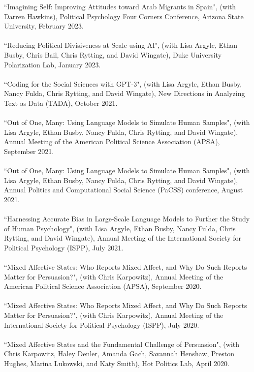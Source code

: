 \documentclass[10pt]{article}
\begin{document}
``Imagining Self: Improving Attitudes toward Arab Migrants in Spain", (with Darren Hawkins), Political Psychology Four Corners Conference, Arizona State University, February 2023.\\
\ \\
``Reducing Political Divisiveness at Scale using AI", (with Lisa Argyle, Ethan Busby, Chris Bail, Chris Rytting, and David Wingate), Duke University Polarization Lab, January 2023.\\
\ \\
``Coding for the Social Sciences with GPT-3", (with Lisa Argyle, Ethan Busby, Nancy Fulda, Chris Rytting, and David Wingate), New Directions in Analyzing Text as Data (TADA), October 2021.\\
\ \\
``Out of One, Many: Using Language Models to Simulate Human Samples", (with Lisa Argyle, Ethan Busby, Nancy Fulda, Chris Rytting, and David Wingate), Annual Meeting of the American Political Science Association (APSA), September 2021.\\
\ \\
``Out of One, Many: Using Language Models to Simulate Human Samples", (with Lisa Argyle, Ethan Busby, Nancy Fulda, Chris Rytting, and David Wingate), Annual Politics and Computational Social Science (PaCSS) conference, August 2021.\\
\ \\
``Harnessing Accurate Bias in Large-Scale Language Models to Further the Study of Human Psychology", (with Lisa Argyle, Ethan Busby, Nancy Fulda, Chris Rytting, and David Wingate), Annual Meeting of the International Society for Political Psychology (ISPP), July 2021.\\
\ \\
``Mixed Affective States: Who Reports Mixed Affect, and Why Do Such Reports Matter for Persuasion?", (with Chris Karpowitz), Annual Meeting of the American Political Science Association (APSA), September 2020.\\
\ \\
``Mixed Affective States: Who Reports Mixed Affect, and Why Do Such Reports Matter for Persuasion?", (with Chris Karpowitz), Annual Meeting of the International Society for Political Psychology (ISPP), July 2020.\\
\ \\
``Mixed Affective States and the Fundamental Challenge of Persuasion", (with Chris Karpowitz, Haley Denler, Amanda Gach, Savannah Henshaw, Preston Hughes, Marina Lukowski, and Katy Smith), Hot Politics Lab, April 2020.\\
\end{document}
